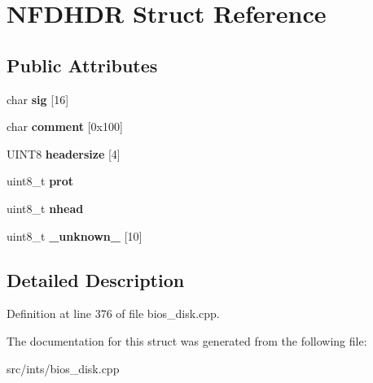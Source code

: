 \hypertarget{structNFDHDR}{\section{N\-F\-D\-H\-D\-R Struct Reference}
\label{structNFDHDR}
}
\subsection*{Public Attributes}
\begin{DoxyCompactItemize}
\item 
\hypertarget{structNFDHDR_a287510a3fba986d88360a51b86662a47}{char {\bfseries sig} \mbox{[}16\mbox{]}}\label{structNFDHDR_a287510a3fba986d88360a51b86662a47}

\item 
\hypertarget{structNFDHDR_a350778cea68716b43c76ae565493e0b7}{char {\bfseries comment} \mbox{[}0x100\mbox{]}}\label{structNFDHDR_a350778cea68716b43c76ae565493e0b7}

\item 
\hypertarget{structNFDHDR_a723cd4bc047e73bed07a4d73194b6f66}{U\-I\-N\-T8 {\bfseries headersize} \mbox{[}4\mbox{]}}\label{structNFDHDR_a723cd4bc047e73bed07a4d73194b6f66}

\item 
\hypertarget{structNFDHDR_a21bbc9bc51e0c4d60f4a346d3200a711}{uint8\-\_\-t {\bfseries prot}}\label{structNFDHDR_a21bbc9bc51e0c4d60f4a346d3200a711}

\item 
\hypertarget{structNFDHDR_aaa6f51d022023940a082286c901d5d48}{uint8\-\_\-t {\bfseries nhead}}\label{structNFDHDR_aaa6f51d022023940a082286c901d5d48}

\item 
\hypertarget{structNFDHDR_a00502b1eed3b27288390871c82277f7d}{uint8\-\_\-t {\bfseries \-\_\-unknown\-\_\-} \mbox{[}10\mbox{]}}\label{structNFDHDR_a00502b1eed3b27288390871c82277f7d}

\end{DoxyCompactItemize}


\subsection{Detailed Description}


Definition at line 376 of file bios\-\_\-disk.\-cpp.



The documentation for this struct was generated from the following file\-:\begin{DoxyCompactItemize}
\item 
src/ints/bios\-\_\-disk.\-cpp\end{DoxyCompactItemize}
